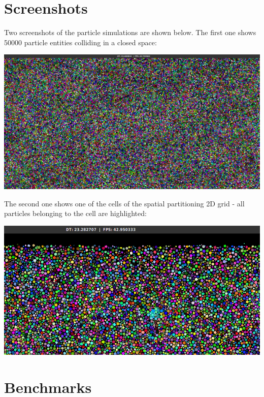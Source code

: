 \documentclass[twoside, 12pt, a4paper, openany]{book}
\let\origfigure=\figure
\let\endorigfigure=\endfigure
\renewenvironment{figure}[1][]{%
\origfigure[H]
}{%
\endorigfigure
}
\begin{document}
\section{Screenshots}\label{screenshots}

Two screenshots of the particle simulations are shown below. The first
one shows 50000 particle entities colliding in a closed space:

\begin{figure}[htbp]
\centering
\includegraphics{source/figures/bench/sc0.png}
\caption{Particle simulation: screenshot - 50000 colliding particles}
\end{figure}

The second one shows one of the cells of the spatial partitioning 2D
grid - all particles belonging to the cell are highlighted:

\begin{figure}[htbp]
\centering
\includegraphics{source/figures/bench/sc1.png}
\caption{Particle simulation: screenshot - spatial partitioning cell}
\end{figure}

\section{Benchmarks}\label{benchmarks}
\end{document}
